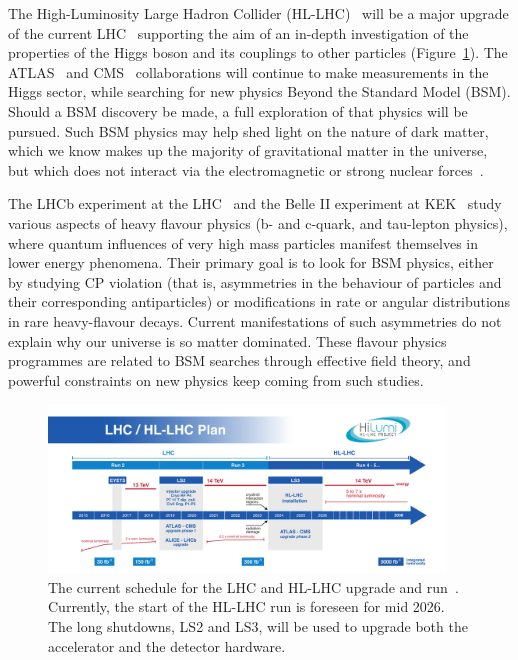 \documentclass[12pt,a4paper]{article}
\begin{document}
The High-Luminosity Large Hadron Collider
(HL-LHC)~\cite{HL-LHC,1742-6596-515-1-012012,Apollinari:2284929} 
will be a major
upgrade of the current LHC~\cite{LHC} supporting the aim of 
an in-depth investigation of the properties of the Higgs boson and its
couplings to other particles (Figure~\ref{fig:hl-lhc}). The ATLAS~\cite{ATLAS} and CMS~\cite{CMS}
collaborations will continue to make measurements in the Higgs sector,
while searching for new physics Beyond the Standard Model (BSM). Should
a BSM discovery be made, a full exploration of that physics will be
pursued. Such BSM physics may help shed light on the nature of dark
matter, which we know makes up the majority of gravitational matter in
the universe, but which does not interact via the electromagnetic or
strong nuclear forces~\cite{Mangano2016}.

The LHCb experiment at the LHC~\cite{LHCb} and the Belle II experiment at
KEK~\cite{BelleII} study various aspects of heavy
flavour physics (b- and c-quark, and tau-lepton physics), where quantum
influences of very high mass particles manifest themselves in lower
energy phenomena. Their primary goal is to look for BSM physics, either
by studying CP violation (that is, asymmetries in the behaviour of
particles and their corresponding antiparticles) or modifications in
rate or angular distributions in rare heavy-flavour decays. Current
manifestations of such asymmetries do not explain why our universe is so
matter dominated. These flavour physics programmes are related to BSM
searches through effective field theory, and powerful constraints on new
physics keep coming from such studies.

\begin{figure}[bthp]
    \centering
    \includegraphics[width=0.94\textwidth]{HL-LHC-plan-2017-Plan-2.pdf}
    \caption{The current schedule for the LHC and HL-LHC upgrade
and run~\cite{HL-LHC}. Currently, the start of the HL-LHC run is foreseen for mid
2026. The long shutdowns, LS2 and LS3, will be used to upgrade both the
accelerator and the detector hardware.}
    \label{fig:hl-lhc}
\end{figure}
\end{document}
